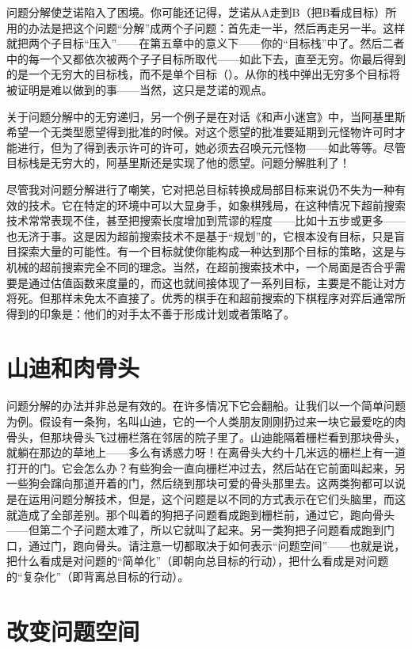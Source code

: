问题分解使芝诺陷入了困境。你可能还记得，芝诺从A走到B（把B看成目标）所用的办法是把这个问题“分解”成两个子问题：首先走一半，然后再走另一半。这样就把两个子目标“压入”——在第五章中的意义下——你的“目标栈”中了。然后二者中的每一个又都依次被两个子子目标所取代——如此下去，直至无穷。你最后得到的是一个无穷大的目标栈，而不是单个目标（）。从你的栈中弹出无穷多个目标将被证明是难以做到的事——当然，这只是芝诺的观点。

关于问题分解中的无穷递归，另一个例子是在对话《和声小迷宫》中，当阿基里斯希望一个无类型愿望得到批准的时候。对这个愿望的批准要延期到元怪物许可时才能进行，但为了得到表示许可的许可，她必须去召唤元元怪物——如此等等。尽管目标栈是无穷大的，阿基里斯还是实现了他的愿望。问题分解胜利了！

尽管我对问题分解进行了嘲笑，它对把总目标转换成局部目标来说仍不失为一种有效的技术。它在特定的环境中可以大显身手，如象棋残局，在这种情况下超前搜索技术常常表现不佳，甚至把搜索长度增加到荒谬的程度——比如十五步或更多——也无济于事。这是因为超前搜索技术不是基于“规划”的，它根本没有目标，只是盲目探索大量的可能性。有一个目标就使你能构成一种达到那个目标的策略，这是与机械的超前搜索完全不同的理念。当然，在超前搜索技术中，一个局面是否合乎需要是通过估值函数来度量的，而这也就间接体现了一系列目标，主要是不能让对方将死。但那样未免太不直接了。优秀的棋手在和超前搜索的下棋程序对弈后通常所得到的印象是：他们的对手太不善于形成计划或者策略了。

\section{山迪和肉骨头}

问题分解的办法并非总是有效的。在许多情况下它会翻船。让我们以一个简单问题为例。假设有一条狗，名叫山迪，它的一个人类朋友刚刚扔过来一块它最爱吃的肉骨头，但那块骨头飞过栅栏落在邻居的院子里了。山迪能隔着栅栏看到那块骨头，就躺在那边的草地上——多么有诱惑力呀！在离骨头大约十几米远的栅栏上有一道打开的门。它会怎么办？有些狗会一直向栅栏冲过去，然后站在它前面叫起来，另一些狗会蹿向那道开着的门，然后绕到那块可爱的骨头那里去。这两类狗都可以说是在运用问题分解技术，但是，这个问题是以不同的方式表示在它们头脑里，而这就造成了全部差别。那个叫着的狗把子问题看成跑到栅栏前，通过它，跑向骨头——但第二个子问题太难了，所以它就叫了起来。另一类狗把子问题看成跑到门口，通过门，跑向骨头。请注意一切都取决于如何表示“问题空间”——也就是说，把什么看成是对问题的“简单化”（即朝向总目标的行动），把什么看成是对问题的“复杂化”（即背离总目标的行动）。

\section{改变问题空间}

